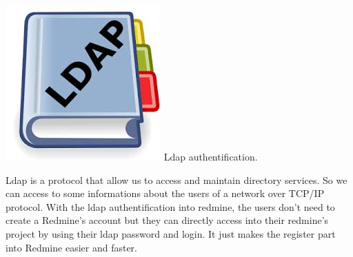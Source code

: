 		\includegraphics[scale=0.1]{Images/ldap.jpeg} 
		Ldap authentification. 

		Ldap is a protocol that allow us to access and maintain directory services. So we can access to some informations about the users of a network over TCP/IP protocol. 
		With the ldap authentification into redmine, the users don't need to create a Redmine's account but they can directly access into their redmine's project by using their ldap password and login.   
		It just makes the register part into Redmine easier and faster.
